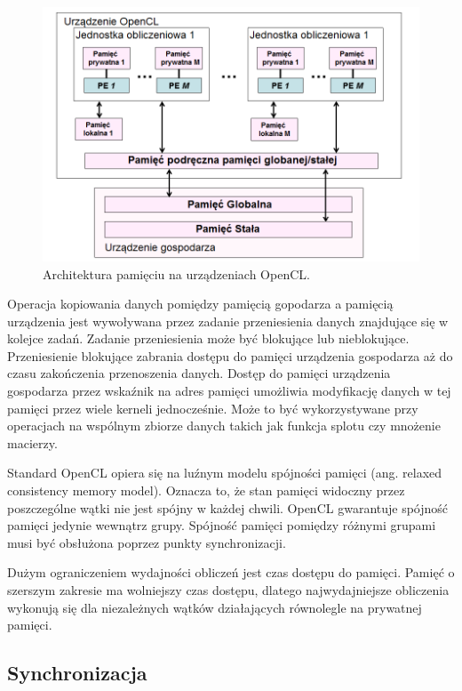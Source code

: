 \begin{figure}[h]
        \centering
                \centering
                \includegraphics[width=12cm]{architekturapamieci}
	\caption{Architektura pamięciu na urządzeniach OpenCL.}
\end{figure}

Operacja kopiowania danych pomiędzy pamięcią gopodarza a pamięcią urządzenia jest wywoływana przez zadanie przeniesienia danych znajdujące się w kolejce zadań. Zadanie przeniesienia może być blokujące lub nieblokujące. Przeniesienie blokujące zabrania dostępu do pamięci urządzenia gospodarza aż do czasu zakończenia przenoszenia danych. Dostęp do pamięci urządzenia gospodarza przez wskaźnik na adres pamięci umożliwia modyfikację danych w tej pamięci przez wiele kerneli jednocześnie. Może to być wykorzystywane przy operacjach na wspólnym zbiorze danych takich jak funkcja splotu czy mnożenie macierzy.

Standard OpenCL opiera się na luźnym modelu spójności pamięci (ang. relaxed consistency memory model). Oznacza to, że stan pamięci widoczny przez poszczególne wątki nie jest spójny w każdej chwili. OpenCL gwarantuje spójność pamięci jedynie wewnątrz grupy. Spójność pamięci pomiędzy różnymi grupami musi być obsłużona poprzez punkty synchronizacji.

Dużym ograniczeniem wydajności obliczeń jest czas dostępu do pamięci. Pamięć o szerszym zakresie ma wolniejszy czas dostępu, dlatego najwydajniejsze obliczenia wykonują się dla niezależnych wątków działających równolegle na prywatnej pamięci.


\subsection{Synchronizacja}\label{sec:OpenC61L}

